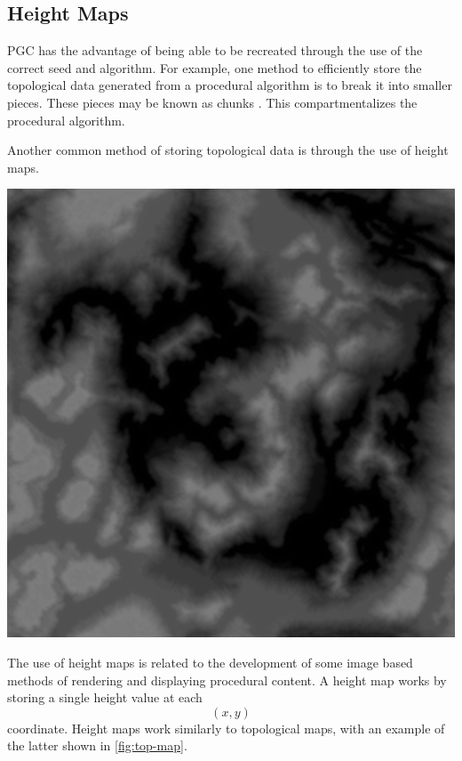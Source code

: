 \documentclass[10pt]{report}
\begin{document}
		\subsection{Height Maps}
			PGC has the advantage of being able to be recreated through the use of the correct seed and algorithm. For example, one method to efficiently store the topological data generated from a procedural algorithm is to break it into smaller pieces. These pieces may be known as chunks \cite{tiling}. This compartmentalizes the procedural algorithm.
			
			Another common method of storing topological data is through the use of height maps. 
			
			\begin{minipage}{\textwidth}
				\centering
				\includegraphics[scale=.4]{D10}
				\label{fig:height-map}
			\end{minipage}
			
			The use of height maps is related to the development of some image based methods of rendering and displaying procedural content. A height map works by storing a single height value at each \[(x,y)\] coordinate. Height maps work similarly to topological maps, with an example of the latter shown in \autoref{fig:top-map}.
			
\end{document}
